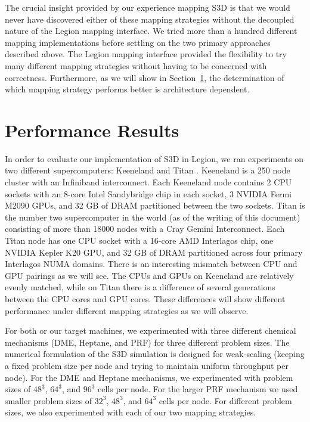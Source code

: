The crucial insight provided by our experience 
mapping S3D is that we would never have discovered
either of these mapping strategies without the
decoupled nature of the Legion mapping interface.
We tried more than a hundred different mapping 
implementations before settling on the two primary 
approaches described above. The Legion mapping 
interface provided the flexibility to try many
different mapping strategies without having to be 
concerned with correctness. Furthermore, as we will
show in Section~\ref{sec:s3dperf}, the determination
of which mapping strategy performs better is 
architecture dependent.

\section{Performance Results}
\label{sec:s3dperf}
In order to evaluate our implementation of S3D in
Legion, we ran experiments on two different
supercomputers: Keeneland \cite{Keeneland} and 
Titan \cite{Top500}. Keeneland is a 250 node cluster
with an Infiniband interconnect. Each Keeneland
node contains 2 CPU sockets with an 8-core Intel
Sandybridge chip in each socket, 3 NVIDIA Fermi
M2090 GPUs, and 32 GB of DRAM partitioned between
the two sockets. Titan is the number two supercomputer
in the world (as of the writing of this document)
consisting of more than 18000 nodes with a Cray
Gemini Interconnect. Each Titan node has one CPU
socket with a 16-core AMD Interlagos chip, one
NVIDIA Kepler K20 GPU, and 32 GB of DRAM partitioned
across four primary Interlagos NUMA domains.
There is an interesting mismatch between CPU and
GPU pairings as we will see. The CPUs and GPUs
on Keeneland are relatively evenly matched, while
on Titan there is a difference of several generations
between the CPU cores and GPU cores. These differences
will show different performance under different
mapping strategies as we will observe.

For both or our target machines, we experimented 
with three different chemical mechanisms (DME, Heptane,
and PRF) for three different problem sizes. The numerical
formulation of the S3D simulation is designed for 
weak-scaling (keeping a fixed problem size per node 
and trying to maintain uniform throughput per node). 
For the DME and Heptane mechanisms, we experimented
with problem sizes of $48^3$, $64^3$, and $96^3$ cells
per node.  For the larger PRF mechanism we used smaller
problem sizes of $32^3$, $48^3$, and $64^3$ cells per
node. For different problem sizes, we also experimented
with each of our two mapping strategies.

